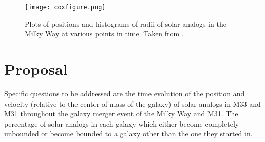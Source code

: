\documentclass{aastex63}
\begin{document}
\begin{figure}
    \centering
    \texttt{[image: coxfigure.png]}
    \caption{Plots of positions and histograms of radii of solar analogs in the Milky Way at various points in time. Taken from \cite{cox08}.}
    \label{coxfigure}
\end{figure}



\section{Proposal} \label{sec:proposal}

Specific questions to be addressed are the time evolution of the position and velocity (relative to the center of mass of the galaxy) of solar analogs in M33 and M31 throughout the galaxy merger event of the Milky Way and M31. The percentage of solar analogs in each galaxy which either become completely unbounded or become bounded to a galaxy other than the one they started in. 
\end{document}
